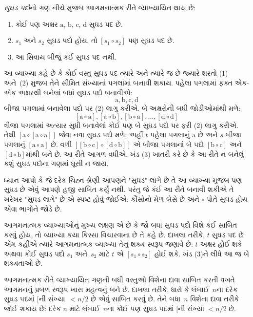 \begin{defn}[સુઘડ પદો]
  \emph{સુઘડ પદો}નો ગણ નીચે મુજબ આગમનાત્મક રીતે
  વ્યાખ્યાયિત થાય છે:
  \begin{enumerate}
  \item કોઈ પણ અક્ષર $\mathrm{a}$, $\mathrm{b}$, $\mathrm{c}$,
    $\mathrm{d}$ સુઘડ પદ છે.
  \item $s_1$ અને $s_2$ સુઘડ પદો હોય, તો
    $[s_1 \circ s_2]$ પણ સુઘડ પદ છે.
  \item આ સિવાય બીજું કંઈ સુઘડ પદ નથી.
  \end{enumerate}
\end{defn}

આ વ્યાખ્યા કહે છે કે કોઈ વસ્તુ સુઘડ પદ ત્યારે અને
ત્યારે જ છે જ્યારે શરતો (1) અને~(2) મુજબ તેને
સીમિત સંખ્યાનાં પગલાંમાં બનાવી શકાય. પહેલા પગલામાં
ફક્ત એક-એક અક્ષરથી બનેલાં બધાં સુઘડ પદો બનાવીએ:
\[
\mathrm{a}, \mathrm{b}, \mathrm{c}, \mathrm{d}
\]
બીજા પગલામાં બનાવેલા પદો પર (2) લાગુ કરીએ. બે
અક્ષરોની બધી જોડીઓમાંથી મળે:
\[
[\mathrm{a} \circ \mathrm{a}], [\mathrm{a} \circ \mathrm{b}],
[\mathrm{b} \circ \mathrm{a}], \dots, [\mathrm{d} \circ \mathrm{d}]
\]
ત્રીજા પગલામાં અત્યાર સુધી બનાવેલાં કોઈ પણ બે
સુઘડ પદો પર ફરી (2) લાગુ કરીએ. તેથી
$[\mathrm{a} \circ [\mathrm{a} \circ
    \mathrm{a}]]$ જેવા નવા સુઘડ પદો મળે: અહીં $t$
પહેલા પગલાનું $\mathrm{a}$ છે અને $s$ બીજા પગલાનું
$[\mathrm{a} \circ \mathrm{a}]$ છે. વળી
$[[\mathrm{b} \circ
    \mathrm{c}] \circ [\mathrm{d} \circ \mathrm{b}]]$
એ બીજા પગલાનાં બે પદો $[\mathrm{b} \circ \mathrm{c}]$
અને $[\mathrm{d}
  \circ \mathrm{b}]$માંથી બને છે. આ રીતે આગળ
વધીએ. ખંડ (3) ખાતરી કરે છે કે આ રીતે ન બનેલું
કશું સુઘડ પદોના ગણમાં ઘૂસી ન જાય.

ધ્યાન આપો કે જે દરેક ચિહ્ન-શ્રેણી આપણને "સુઘડ"
લાગે છે તે આ વ્યાખ્યા મુજબ પણ સુઘડ છે એવું
આપણે હજી સાબિત કર્યું નથી. પરંતુ જે કંઈ આ
રીતે બનાવી શકીએ તે ખરેખર "સુઘડ લાગે" છે
એ સ્પષ્ટ હોવું જોઈએ: કૌંસોનો મેળ બેસે છે અને
$\circ$ પોતે સુઘડ હોય એવા ભાગોને જોડે છે.

આગમનાત્મક વ્યાખ્યાઓનું મુખ્ય લક્ષણ એ છે કે જો
બધાં સુઘડ પદો વિશે કંઈ સાબિત કરવું હોય, તો વ્યાખ્યા
કયા કિસ્સા વિચારવાના છે તે કહે છે. દાખલા તરીકે,
$t$ સુઘડ પદ છે એમ કહીએ ત્યારે આગમનાત્મક
વ્યાખ્યા તેનું શક્ય સ્વરૂપ જણાવે છે: $t$ અક્ષર
હોઈ શકે અથવા કોઈ સુઘડ પદો $s_1$ અને~$s_2$
માટે $t$ એ $[s_1 \circ s_2]$ હોઈ શકે. ખંડ (3)ને
લીધે આ જ બે શક્યતાઓ છે.

આગમનાત્મક રીતે વ્યાખ્યાયિત ગણની બધી વસ્તુઓ
વિશેના દાવા સાબિત કરતી વખતે આગમનનું પ્રબળ સ્વરૂપ
ખાસ મહત્વનું બને છે. દાખલા તરીકે, ધારો કે
લંબાઈ~$n$ના દરેક સુઘડ પદમાં $[$ની સંખ્યા~$< n/2$
છે એવું સાબિત કરવું છે. તેને બધા~$n$ વિશેના
દાવા તરીકે જોઈ શકાય છે: દરેક $n$ માટે લંબાઈ~$n$ના
કોઈ પણ સુઘડ પદમાં $[$ની સંખ્યા $< n/2$ છે.

